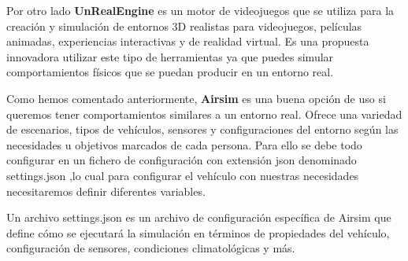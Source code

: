 Por otro lado \textbf{UnRealEngine} es un motor de videojuegos que se utiliza para la creación y simulación de entornos 3D realistas para videojuegos,
películas animadas, experiencias interactivas y de realidad virtual. Es una propuesta innovadora utilizar este tipo de herramientas ya que puedes simular 
comportamientos físicos que se puedan producir en un entorno real. 

Como hemos comentado anteriormente, \textbf{Airsim} es una buena opción de uso si queremos tener comportamientos
similares a un entorno real. Ofrece una variedad de escenarios, tipos de vehículos, sensores y configuraciones del entorno 
según las necesidades u objetivos marcados de cada persona. 
Para ello se debe todo configurar en un fichero de configuración con extensión json denominado settings.json ,lo cual para configurar
el vehículo con nuestras necesidades necesitaremos definir diferentes variables. 

Un archivo settings.json es un archivo de configuración específica de Airsim que define cómo 
se ejecutará la simulación en términos de propiedades del vehículo, configuración de sensores, condiciones climatológicas y más. 

